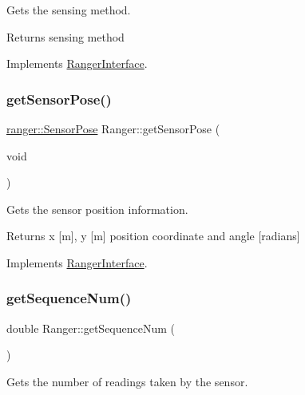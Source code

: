 Gets the sensing method. 

\begin{DoxyReturn}{Returns}
sensing method 
\end{DoxyReturn}


Implements \hyperlink{classRangerInterface_aeb06b9835f2b162b81917bd27797549b}{Ranger\+Interface}.

\mbox{\label{classRanger_aec1e730fbf4b46b01b08f6655152fc39}} 
\subsubsection{\texorpdfstring{get\+Sensor\+Pose()}{getSensorPose()}}
{\footnotesize\ttfamily \hyperlink{structranger_1_1SensorPose}{ranger\+::\+Sensor\+Pose} Ranger\+::get\+Sensor\+Pose (\begin{DoxyParamCaption}\item[{void}]{ }\end{DoxyParamCaption})\hspace{0.3cm}{\ttfamily [virtual]}}



Gets the sensor position information. 

\begin{DoxyReturn}{Returns}
x \mbox{[}m\mbox{]}, y \mbox{[}m\mbox{]} position coordinate and angle \mbox{[}radians\mbox{]} 
\end{DoxyReturn}


Implements \hyperlink{classRangerInterface_a7f6db3f603d997ad6c5aa5c7778261f4}{Ranger\+Interface}.

\mbox{\label{classRanger_a35dfc3ff4e5c6c31a8625e972365006e}} 
\subsubsection{\texorpdfstring{get\+Sequence\+Num()}{getSequenceNum()}}
{\footnotesize\ttfamily double Ranger\+::get\+Sequence\+Num (\begin{DoxyParamCaption}{ }\end{DoxyParamCaption})}



Gets the number of readings taken by the sensor. 

